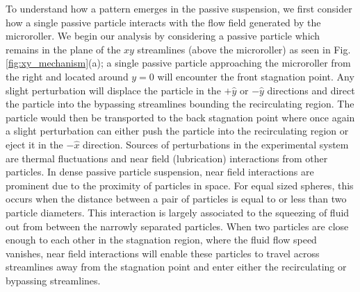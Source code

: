 \documentclass[12pt]{article}
\begin{document}
To understand how a pattern emerges in the passive suspension, we first consider how a single passive particle interacts with the flow field generated by the microroller. We begin our analysis by considering a passive particle which remains in the plane of the $xy$ streamlines (above the microroller) as seen in Fig. \ref{fig:xy_mechanism}(a);
a single passive particle approaching the microroller from the right and located around $y=0$  will encounter the front stagnation point. Any slight perturbation will displace the particle in the $+ \hat{y}$ or $ -\hat{y}$ directions and direct the particle into the bypassing streamlines bounding the recirculating region. The particle would then be transported to the back stagnation point where once again a slight perturbation can either push the particle into the recirculating region or eject it in the $- \hat{x}$ direction. Sources of perturbations in the experimental system are thermal fluctuations and near field (lubrication) interactions from other particles. In dense passive particle suspension, near field interactions are prominent due to the proximity of particles in space. 
For equal sized spheres, this occurs when the distance between a pair of particles is equal to or less than two particle diameters. This interaction is largely associated to the squeezing of fluid out from between the narrowly separated particles. When two particles are close enough to each other in the stagnation region, where the fluid flow speed vanishes, near field interactions will enable these particles to travel across streamlines away from the stagnation point and enter either the recirculating or bypassing streamlines.
\end{document}
